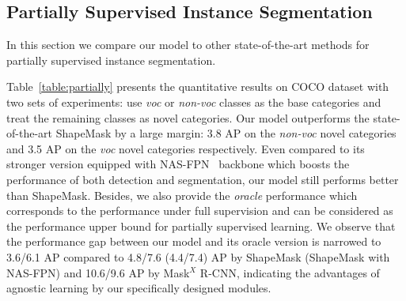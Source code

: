 \documentclass[runningheads]{llncs}
\begin{document}
\vspace{-0.15in}
\subsection{Partially Supervised Instance Segmentation}
\vspace{-2mm}

In this section we compare our model to other state-of-the-art methods for partially supervised instance segmentation.

Table~\ref{table:partially} presents the quantitative results on COCO dataset with two sets of experiments: use \emph{voc} or \emph{non-voc} classes as the base categories and treat the remaining classes as novel categories.
Our model outperforms the state-of-the-art ShapeMask by a large margin: 3.8 AP on the \emph{non-voc} novel categories and 3.5 AP on the \emph{voc} novel categories respectively. Even compared to its stronger version equipped with NAS-FPN~\cite{ghiasi2019fpn} backbone which boosts the performance of both detection and segmentation, our model still performs better than ShapeMask. Besides, we also provide the \emph{oracle} performance which corresponds to the 
performance under full supervision and can be considered as the performance upper bound for partially supervised learning.  
We observe that the performance gap between our model and its oracle version is narrowed to 3.6/6.1 AP compared to 4.8/7.6 (4.4/7.4) AP by ShapeMask (ShapeMask with NAS-FPN) and 10.6/9.6 AP by Mask$^X$ R-CNN, indicating the advantages of agnostic learning by our specifically designed modules. 
\setlength{\tabcolsep}{1.0pt}
\end{document}
